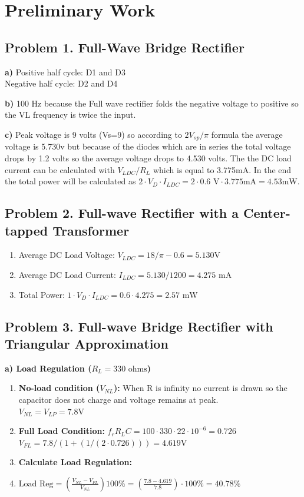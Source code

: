 \clearpage
\section*{Preliminary Work}

\subsection*{Problem 1. Full-Wave Bridge Rectifier}


\textbf{a)} Positive half cycle: D1 and D3 \\
Negative half cycle: D2 and D4

\textbf{b)} 100 Hz because the Full wave rectifier folds the negative voltage to positive so the VL frequency is twice the input.

\textbf{c)} Peak voltage is 9 volts (Vs=9) so according to $2V_{sp}/\pi$ formula the average voltage is 5.730v but because of the diodes which are in series the total voltage drops by 1.2 volts so the average voltage drops to 4.530 volts. 
The the DC load current can be calculated with $V_{LDC}/R_L$ which is equal to 3.775mA. 
In the end the total power will be calculated as $2 \cdot V_D \cdot I_{LDC} = 2 \cdot 0.6\text{ V} \cdot 3.775\text{mA} = 4.53\text{mW}$.

\subsection*{Problem 2. Full-wave Rectifier with a Center-tapped Transformer}
\begin{enumerate}
    \item Average DC Load Voltage: $V_{LDC} = 18/\pi - 0.6 = 5.130\text{V}$
    \item Average DC Load Current: $I_{LDC} = 5.130/1200 = 4.275\text{ mA}$
    \item Total Power: $1 \cdot V_D \cdot I_{LDC} = 0.6 \cdot 4.275 = 2.57\text{ mW}$
\end{enumerate}

\subsection*{Problem 3. Full-wave Bridge Rectifier with Triangular Approximation}
\textbf{a) Load Regulation ($R_L = 330\text{ ohms}$)}
\begin{enumerate}
    \item \textbf{No-load condition ($V_{NL}$):} When R is infinity no current is drawn so the capacitor does not charge and voltage remains at peak. \\
    $V_{NL} = V_{LP} = 7.8\text{V}$
    \item \textbf{Full Load Condition:} $f_r R_L C = 100 \cdot 330 \cdot 22 \cdot 10^{-6} = 0.726$ \\
    $V_{FL} = 7.8 / (1 + (1 / (2 \cdot 0.726))) = 4.619\text{V}$
    \item \textbf{Calculate Load Regulation:}
    \item $\text{Load Reg} = \left(\frac{V_{NL} - V_{FL}}{V_{NL}}\right) 100\% = \left(\frac{7.8 - 4.619}{7.8}\right) \cdot 100\% = 40.78\%$
\end{enumerate}


